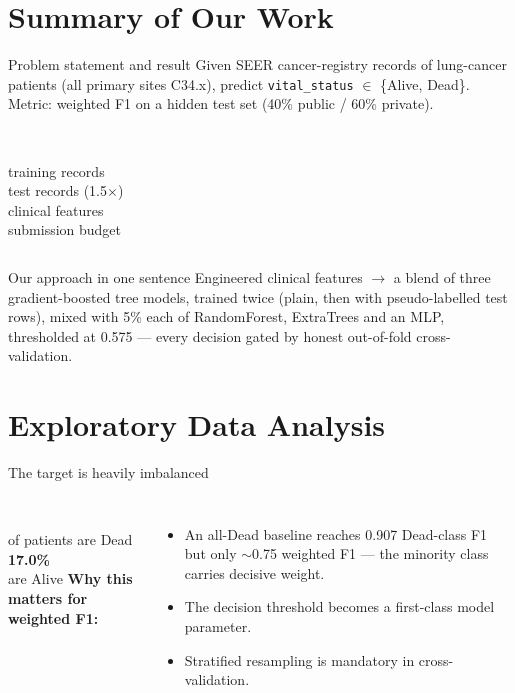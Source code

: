 \documentclass[aspectratio=169,10pt]{beamer}
\newcommand{\stat}[2]{{\color{navy}\ttfamily\bfseries\large #1}\\{\scriptsize\color{mutedgray}#2}}
\newcommand{\astat}[2]{{\color{burg}\ttfamily\bfseries\large #1}\\{\scriptsize\color{mutedgray}#2}}
\begin{document}
\section{Summary of Our Work}

\begin{frame}{Problem statement and result}
  Given SEER cancer-registry records of lung-cancer patients (all primary sites C34.x),
  predict \texttt{vital\_status} $\in$ \{Alive, Dead\}. Metric: \alert{weighted F1}
  on a hidden test set (40\% public / 60\% private).
  \vspace{6pt}
  \begin{columns}
    \centering \stat{24{,}000}{training records}
    \centering \stat{36{,}000}{test records (1.5$\times$)}
    \centering \stat{36}{clinical features}
    \centering \stat{6/day}{submission budget}
  \end{columns}
  \vspace{8pt}
  \begin{block}{Our approach in one sentence}
    Engineered clinical features $\rightarrow$ a blend of three gradient-boosted tree models,
    trained twice (plain, then with pseudo-labelled test rows), mixed with 5\% each of
    RandomForest, ExtraTrees and an MLP, thresholded at 0.575 --- every decision gated by
    honest out-of-fold cross-validation.
  \end{block}
\end{frame}

\section{Exploratory Data Analysis}

\begin{frame}{The target is heavily imbalanced}
  \begin{columns}
    \centering \stat{83.0\%}{of patients are Dead}\\[10pt] \astat{17.0\%}{are Alive}
    \textbf{Why this matters for weighted F1:}
    \begin{itemize}
      \item An all-Dead baseline reaches 0.907 Dead-class F1 but only $\sim$0.75 weighted F1 ---
            the minority class carries decisive weight.
      \item The decision threshold becomes a first-class model parameter.
      \item Stratified resampling is mandatory in cross-validation.
    \end{itemize}
  \end{columns}
\end{frame}
\end{document}
